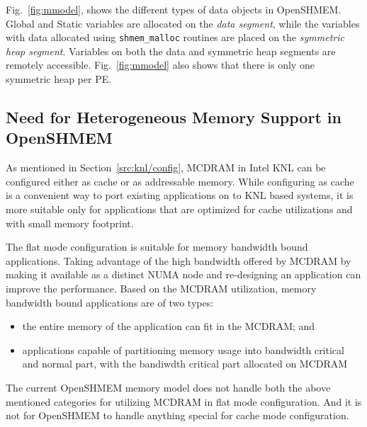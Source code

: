 Fig.~\ref{fig:mmodel}, shows the different types of data objects in
OpenSHMEM. Global and Static variables are allocated on the
\emph{data segment}, while the variables with data allocated using
\texttt{shmem\_malloc} routines are placed on the \emph{symmetric heap
segment}. Variables on both the data and symmetric heap segments are
remotely accessible. Fig.~\ref{fig:mmodel} also shows that there is only
one symmetric heap per PE. %

\subsection{Need for Heterogeneous Memory Support in OpenSHMEM}
\label{src:mmodel/drelated}
As mentioned in Section~\ref{src:knl/config}, MCDRAM in Intel KNL can be
configured either as cache or as addressable memory. While configuring as
cache is a convenient way to port existing applications on to KNL based
systems, it is more suitable only for applications that are optimized for
cache utilizations and with small memory footprint.

The flat mode configuration is suitable for memory bandwidth bound
applications. Taking advantage of the high bandwidth offered by MCDRAM by
making it available as a distinct NUMA node and re-designing an application
can improve the performance. Based on the MCDRAM utilization, memory
bandwidth bound applications are of two types:
\begin{itemize}
    \item the entire memory of the application can fit in the MCDRAM; and
    \item applications capable of partitioning memory usage into
    bandwidth critical and normal part, with the bandiwdth critical part
    allocated on MCDRAM
\end{itemize}
The current OpenSHMEM memory model does not handle both the above mentioned
categories for utilizing MCDRAM in flat mode configuration. And it is not
for OpenSHMEM to handle anything special for cache mode configuration.
